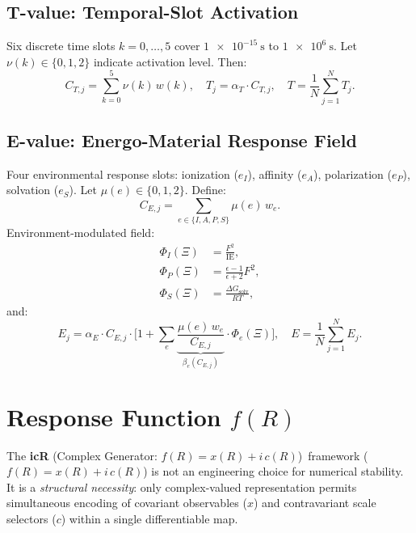 \documentclass[11pt]{article}
\DeclareMathOperator{\IE}{IE}
\DeclareMathOperator{\solv}{solv}
\newcommand{\icR}{\textbf{icR} (Complex Generator: $f(R)=x(R)+i\,c(R)$)}
\begin{document}
\subsection{T-value: Temporal-Slot Activation}
\label{subsec:t-value}
Six discrete time slots $k=0,\dots,5$ cover $\SI{1e-15}{\second}$ to $\SI{1e6}{\second}$. Let $\nu(k) \in \{0,1,2\}$ indicate activation level. Then:
\begin{equation}
    C_{T,j} = \sum_{k=0}^{5} \nu(k)\, w(k), \quad
    T_j = \alpha_T \cdot C_{T,j}, \quad
    T = \frac{1}{N}\sum_{j=1}^N T_j.
    \label{eq:t-j-and-mean}
\end{equation}

\subsection{E-value: Energo-Material Response Field}
\label{subsec:e-value}
Four environmental response slots: ionization ($e_I$), affinity ($e_A$), polarization ($e_P$), solvation ($e_S$). Let $\mu(e) \in \{0,1,2\}$. Define:
\begin{equation}
    C_{E,j} = \sum_{e \in \{I,A,P,S\}} \mu(e)\, w_e.
    \label{eq:ce-j}
\end{equation}
Environment-modulated field:
\begin{align}
    \Phi_I(\Xi) &= \frac{F^2}{\IE}, 
    \label{eq:phi-ionization} \\
    \Phi_P(\Xi) &= \frac{\epsilon - 1}{\epsilon + 2} F^2, 
    \label{eq:phi-polarization} \\
    \Phi_S(\Xi) &= \frac{\Delta G_{\solv}}{RT},
    \label{eq:phi-solvation}
\end{align}
and:
\begin{equation}
    E_j = \alpha_E \cdot C_{E,j} \cdot \Bigg[1 + \sum_{e} \underbrace{\frac{\mu(e)\, w_e}{C_{E,j}}}_{\beta_e(C_{E,j})} \cdot \Phi_e(\Xi) \Bigg], \quad
    E = \frac{1}{N}\sum_{j=1}^N E_j.
    \label{eq:e-j-and-mean}
\end{equation}

\section{Response Function $f(R)$}
\label{sec:response-function}

The \icR\ framework ($f(R) = x(R) + i\,c(R)$) is not an engineering choice for numerical stability. It is a \emph{structural necessity}: only complex-valued representation permits simultaneous encoding of covariant observables ($x$) and contravariant scale selectors ($c$) within a single differentiable map.
\end{document}

